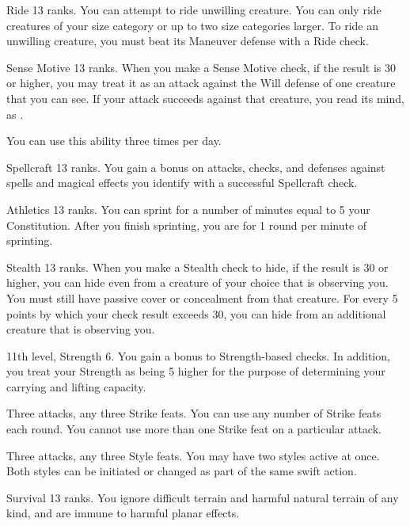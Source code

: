 \featpre Ride 13 ranks.
\featben You can attempt to ride unwilling creature.
You can only ride creatures of your size category or up to two size categories larger.
To ride an unwilling creature, you must beat its Maneuver defense with a Ride check.

\featpre Sense Motive 13 ranks.
\featben When you make a Sense Motive check, if the result is 30 or higher, you may treat it as an attack against the Will defense of one creature that you can see.
If your attack succeeds against that creature, you read its mind, as .

You can use this ability three times per day.

\featpre Spellcraft 13 ranks.
\featben You gain a  bonus on attacks, checks, and defenses against spells and magical effects you identify with a successful Spellcraft check.

\featpre Athletics 13 ranks.
\featben You can sprint for a number of minutes equal to 5 \add your Constitution.
After you finish sprinting, you are \fatigued for 1 round per minute of sprinting.

\featpre Stealth 13 ranks.
\featben When you make a Stealth check to hide, if the result is 30 or higher, you can hide even from a creature of your choice that is observing you.
You must still have passive cover or concealment from that creature.
For every 5 points by which your check result exceeds 30, you can hide from an additional creature that is observing you.

\featpre 11th level, Strength 6.
\featben You gain a  bonus to Strength-based checks.
In addition, you treat your Strength as being 5 higher for the purpose of determining your carrying and lifting capacity.

\featpre Three attacks, any three Strike feats.
\featben You can use any number of Strike feats each round.
You cannot use more than one Strike feat on a particular attack.

\featpre Three attacks, any three Style feats.
\featben You may have two styles active at once.
Both styles can be initiated or changed as part of the same swift action.

\featpre Survival 13 ranks.
\featben You ignore difficult terrain and harmful natural terrain of any kind, and are immune to harmful planar effects.

